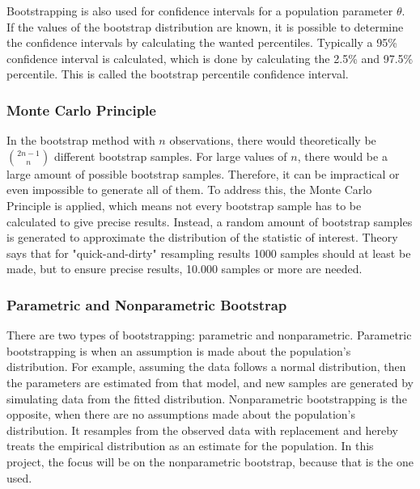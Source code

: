 \noindent Bootstrapping is also used for confidence intervals for a population parameter $\theta$. If the values of the bootstrap distribution are known, it is possible to determine the confidence intervals by calculating the wanted percentiles. Typically a 95\% confidence interval is calculated, which is done by calculating the 2.5\% and 97.5\% percentile. This is called the bootstrap percentile confidence interval.

\subsubsection{Monte Carlo Principle}
In the bootstrap method with $n$ observations, there would theoretically be $\binom{2n-1}{n}$ different bootstrap samples. For large values of $n$, there would be a large amount of possible bootstrap samples. Therefore, it can be impractical or even impossible to generate all of them. To address this, the Monte Carlo Principle is applied, which means not every bootstrap sample has to be calculated to give precise results. Instead, a random amount of bootstrap samples is generated to approximate the distribution of the statistic of interest. Theory says that for "quick-and-dirty" resampling results 1000 samples should at least be made, but to ensure precise results, 10.000 samples or more are needed.

\subsubsection{Parametric and Nonparametric Bootstrap}
There are two types of bootstrapping: parametric and nonparametric. Parametric bootstrapping is when an assumption is made about the population's distribution. For example, assuming the data follows a normal distribution, then the parameters are estimated from that model, and new samples are generated by simulating data from the fitted distribution. Nonparametric bootstrapping is the opposite, when there are no assumptions made about the population's distribution. It resamples from the observed data with replacement and hereby treats the empirical distribution as an estimate for the population. In this project, the focus will be on the nonparametric bootstrap, because that is the one used. \newline

